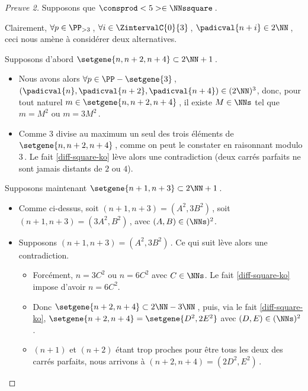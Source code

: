 	
\begin{proof}[Preuve 2]
    Supposons que $\consprod<5> \in \NNssquare$\,.
    
    \smallskip
    
	Clairement, $\forall p \in \PP_{>3}$\,, 
   	$\forall i \in \ZintervalC{0}{3}$\,, 
    $\padicval{n + i} \in 2 \NN$\,,
    ceci nous amène à considérer deux alternatives.
    
    \medskip
    
    Supposons d'abord $\setgene{n, n + 2, n + 4} \subset 2 \NN + 1$\,.
	\begin{itemize}
		\item
		Nous avons alors
		$\forall p \in \PP - \setgene{3}$\,, 
   		$(\padicval{n}, \padicval{n+2}, \padicval{n+4}) \in ( 2 \NN )^3$,
		donc, pour tout naturel $m \in \setgene{n, n + 2, n + 4}$\,, 
		il existe $M \in \NNs$ tel que 
		$m = M^2$ ou $m = 3 M^2$\,.
	
		\item Comme $3$ divise au maximum un seul des trois éléments de $\setgene{n, n + 2, n + 4}$\,, comme on peut le constater en raisonnant modulo $3$\,.
		Le fait \ref{diff-square-ko} lève alors une contradiction (deux carrés parfaits ne sont jamais distants de $2$ ou $4$).
    \end{itemize}
    
    \medskip
    
    Supposons maintenant $\setgene{n + 1, n + 3} \subset 2 \NN + 1$\,.
	\begin{itemize}
		\item
		Comme ci-dessus,
		soit $(n + 1, n + 3) = (A^2, 3 B^2)$\,,
		soit $(n + 1, n + 3) = (3 A^2, B^2)$\,,
		avec $(A, B) \in ( \NNs )^2$.
	
		\item Supposons $(n + 1, n + 3) = (A^2, 3 B^2)$\,. Ce qui suit lève alors une contradiction.
		\begin{itemize}
			\item Forcément, $n = 3 C^2$ ou $n = 6 C^2$ avec $C \in \NNs$.
			Le fait \ref{diff-square-ko} impose d'avoir $n = 6 C^2$.

			\item Donc 
			$\setgene{n + 2, n + 4} \subset 2 \NN - 3 \NN$\,, 
			puis, via le fait \ref{diff-square-ko},
			$\setgene{n + 2, n + 4} = \setgene{D^2, 2 E^2}$ 
			avec $(D, E) \in ( \NNs )^2$.

			\item $(n+1)$ et $(n+2)$ étant trop proches pour être tous les deux des carrés parfaits, nous arrivons à $(n + 2, n + 4) = (2 D^2, E^2)$\,.


\end{itemize}
\end{itemize}
\end{proof}
